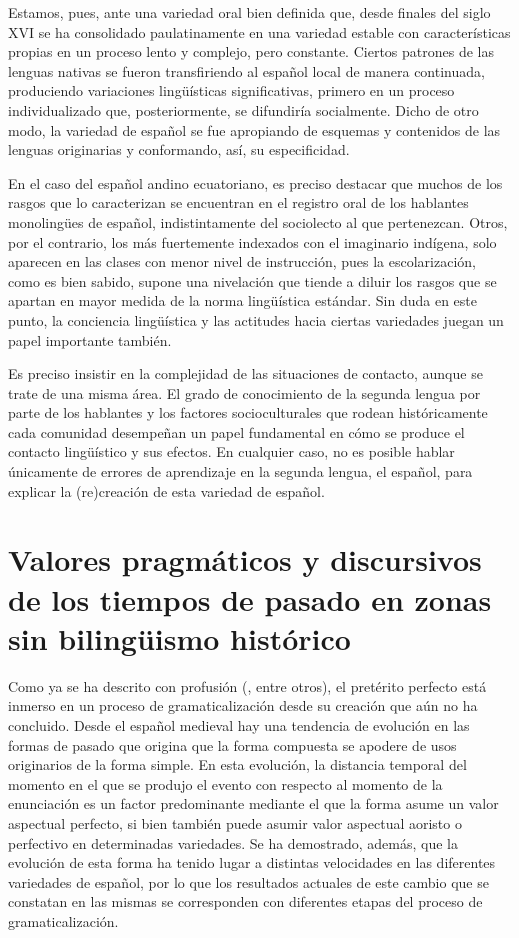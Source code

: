 \documentclass[output=paper]{../langscibook}
\begin{document}
Estamos, pues, ante una variedad oral bien definida que, desde finales del siglo XVI se ha consolidado paulatinamente en una variedad estable con características propias en un proceso lento y complejo, pero constante. Ciertos patrones de las lenguas nativas se fueron transfiriendo al español local de manera continuada, produciendo variaciones lingüísticas significativas, primero en un proceso individualizado que, posteriormente, se difundiría socialmente. Dicho de otro modo, la variedad de español se fue apropiando de esquemas y contenidos de las lenguas originarias y conformando, así, su especificidad.

En el caso del español andino ecuatoriano, es preciso destacar que muchos de los rasgos que lo caracterizan se encuentran en el registro oral de los hablantes monolingües de español, indistintamente del sociolecto al que pertenezcan. Otros, por el contrario, los más fuertemente indexados con el imaginario indígena, solo aparecen en las clases con menor nivel de instrucción, pues la escolarización, como es bien sabido, supone una nivelación que tiende a diluir los rasgos que se apartan en mayor medida de la norma lingüística estándar. Sin duda en este punto, la conciencia lingüística y las actitudes hacia ciertas variedades juegan un papel importante también. 

Es preciso insistir en la complejidad de las situaciones de contacto, aunque se trate de una misma área. El grado de conocimiento de la segunda lengua por parte de los hablantes y los factores socioculturales que rodean históricamente cada comunidad desempeñan un papel fundamental en cómo se produce el contacto lingüístico y sus efectos. En cualquier caso, no es posible hablar únicamente de errores de aprendizaje en la segunda lengua, el español, para explicar la (re)creación de esta variedad de español. 

\section{Valores pragmáticos y discursivos de los tiempos de pasado en zonas sin bilingüismo histórico}\label{sec:palacios:3}


Como ya se ha descrito con profusión (\citealt{BentivoglioSedano1992,DeJong1999,Harris1982,Hernández2006,Hernández2013,HoweSchwenter2003,JaraYupanqui2009,Martínez-Atienza2008}, entre otros), el pretérito perfecto está inmerso en un proceso de gramaticalización desde su creación que aún no ha concluido. Desde el español medieval hay una tendencia de evolución en las formas de pasado que origina que la forma compuesta se apodere de usos originarios de la forma simple. En esta evolución, la distancia temporal del momento en el que se produjo el evento con respecto al momento de la enunciación es un factor predominante mediante el que la forma asume un valor aspectual perfecto, si bien también puede asumir valor aspectual aoristo o perfectivo en determinadas variedades. Se ha demostrado, además, que la evolución de esta forma ha tenido lugar a distintas velocidades en las diferentes variedades de español, por lo que los resultados actuales de este cambio que se constatan en las mismas se corresponden con diferentes etapas del proceso de gramaticalización.
\end{document}
